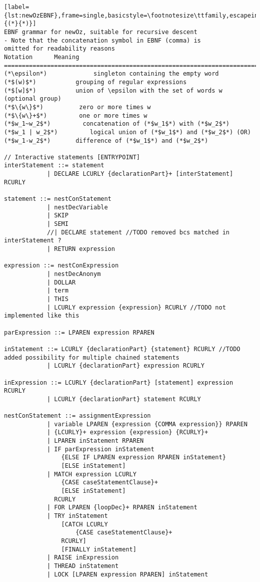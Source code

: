 \begin{lstlisting}[label={lst:newOzEBNF},frame=single,basicstyle=\footnotesize\ttfamily,escapeinside={(*}{*)}]
EBNF grammar for newOz, suitable for recursive descent
- Note that the concatenation symbol in EBNF (comma) is
omitted for readability reasons
Notation      Meaning
===========================================================================
(*\epsilon*)             singleton containing the empty word
(*$(w)$*)           grouping of regular expressions
(*$[w]$*)           union of \epsilon with the set of words w (optional group)
(*$\{w\}$*)          zero or more times w
(*$\{w\}+$*)         one or more times w
(*$w_1~w_2$*)         concatenation of (*$w_1$*) with (*$w_2$*)
(*$w_1 | w_2$*)         logical union of (*$w_1$*) and (*$w_2$*) (OR)
(*$w_1-w_2$*)       difference of (*$w_1$*) and (*$w_2$*)

// Interactive statements [ENTRYPOINT]
interStatement ::= statement
            | DECLARE LCURLY {declarationPart}+ [interStatement] RCURLY

statement ::= nestConStatement
            | nestDecVariable
            | SKIP
            | SEMI
            //| DECLARE statement //TODO removed bcs matched in interStatement ?
            | RETURN expression

expression ::= nestConExpression
            | nestDecAnonym
            | DOLLAR
            | term
            | THIS
            | LCURLY expression {expression} RCURLY //TODO not implemented like this

parExpression ::= LPAREN expression RPAREN

inStatement ::= LCURLY {declarationPart} {statement} RCURLY //TODO added possibility for multiple chained statements
            | LCURLY {declarationPart} expression RCURLY

inExpression ::= LCURLY {declarationPart} [statement] expression RCURLY
            | LCURLY {declarationPart} statement RCURLY

nestConStatement ::= assignmentExpression
            | variable LPAREN {expression {COMMA expression}} RPAREN
            | {LCURLY}+ expression {expression} {RCURLY}+
            | LPAREN inStatement RPAREN
            | IF parExpression inStatement
                {ELSE IF LPAREN expression RPAREN inStatement}
                [ELSE inStatement]
            | MATCH expression LCURLY
                {CASE caseStatementClause}+
                [ELSE inStatement]
              RCURLY
            | FOR LPAREN {loopDec}+ RPAREN inStatement
            | TRY inStatement
                [CATCH LCURLY
                    {CASE caseStatementClause}+
                RCURLY]
                [FINALLY inStatement]
            | RAISE inExpression
            | THREAD inStatement
            | LOCK [LPAREN expression RPAREN] inStatement


\end{lstlisting}
